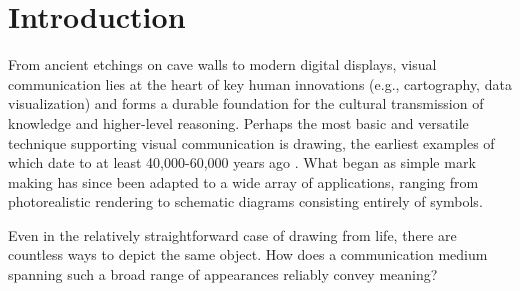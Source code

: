 \documentclass[11pt,letterpaper]{article}
\begin{document}
\section{Introduction}

From ancient etchings on cave walls to modern digital displays, visual communication lies at the heart of key human innovations (e.g., cartography, data visualization) and forms a durable foundation for the cultural transmission of knowledge and higher-level reasoning.
Perhaps the most basic and versatile technique supporting visual communication is drawing, the earliest examples of which date to at least 40,000-60,000 years ago \cite{hoffmann2018u}.
What began as simple mark making has since been adapted to a wide array of applications, ranging from photorealistic rendering to schematic diagrams consisting entirely of symbols.

Even in the relatively straightforward case of drawing from life, there are countless ways to depict the same object.
How does a communication medium spanning such a broad range of appearances reliably convey meaning?
\end{document}

